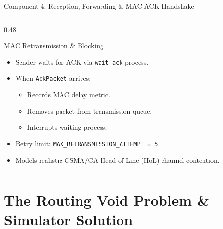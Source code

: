 \documentclass[aspectratio=169,10pt]{beamer}
\begin{document}
\begin{frame}{Component 4: Reception, Forwarding \& MAC ACK Handshake}
\begin{columns}[T]
    \begin{column}{0.48\textwidth}
      \begin{block}{MAC Retransmission \& Blocking}
        \begin{itemize}\setlength{\itemsep}{0.3em}
          \item Sender waits for ACK via \texttt{wait\_ack} process.
          \item When \texttt{AckPacket} arrives:
            \begin{itemize}\setlength{\itemsep}{0.15em}
              \item Records MAC delay metric.
              \item Removes packet from transmission queue.
              \item Interrupts waiting process.
            \end{itemize}
          \item Retry limit: \texttt{MAX\_RETRANSMISSION\_ATTEMPT = 5}.
          \item Models realistic CSMA/CA Head-of-Line (HoL) channel contention.
        \end{itemize}
      \end{block}
    \end{column}
  \end{columns}
\end{frame}

\section{The Routing Void Problem \& Simulator Solution}
\end{document}
